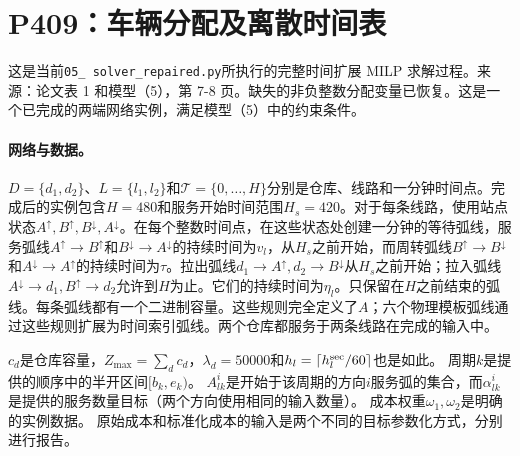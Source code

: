 \documentclass[11pt]{article}
\begin{document}
\section*{P409：车辆分配及离散时间表}
这是当前\texttt{05\_ solver\_repaired.py}所执行的完整时间扩展 MILP 求解过程。来源：论文表 1 和模型（5），第 7-8 页。缺失的非负整数分配变量已恢复。这是一个已完成的两端网络实例，满足模型（5）中的约束条件。

\paragraph{网络与数据。}
$D=\{d_1,d_2\}$、$L=\{l_1,l_2\}$和$\mathcal T=\{0,\ldots,H\}$分别是仓库、线路和一分钟时间点。完成后的实例包含$H=480$和服务开始时间范围$H_s=420$。对于每条线路，使用站点状态$A^\uparrow,B^\uparrow,
B^\downarrow,A^\downarrow$。在每个整数时间点，在这些状态处创建一分钟的等待弧线，服务弧线$A^\uparrow\to B^\uparrow$和$B^\downarrow\to A^\downarrow$的持续时间为$v_l$，从$H_s$之前开始，而周转弧线$B^\uparrow\to B^\downarrow$和$A^\downarrow\to A^\uparrow$的持续时间为$\tau$。拉出弧线$d_1\to A^\uparrow,d_2\to B^\downarrow$从$H_s$之前开始；拉入弧线$A^\downarrow\to d_1,B^\uparrow\to d_2$允许到$H$为止。它们的持续时间为$\eta_l$。只保留在$H$之前结束的弧线。每条弧线都有一个二进制容量。这些规则完全定义了$A$；六个物理模板弧线通过这些规则扩展为时间索引弧线。两个仓库都服务于两条线路在完成的输入中。

$c_d$是仓库容量，$Z_{\max}=\sum_dc_d$，$\lambda_d=50000$和$h_l=\lceil h_l^{\rm sec}/60\rceil$也是如此。  
周期$k$是提供的顺序中的半开区间$[b_k,e_k)$。  
$A^i_{lk}$是开始于该周期的方向$i$服务弧的集合，而$\alpha^i_{lk}$是提供的服务数量目标（两个方向使用相同的输入数量）。  
成本权重$\omega_1,\omega_2$是明确的实例数据。  
原始成本和标准化成本的输入是两个不同的目标参数化方式，分别进行报告。
\end{document}
